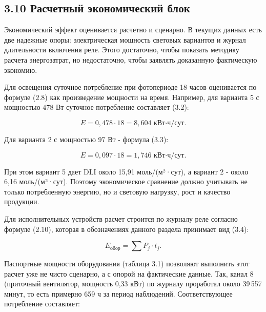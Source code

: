 \documentclass[a4paper,14pt]{extarticle}
\begin{document}
\hypertarget{ux440ux430ux441ux447ux435ux442ux43dux44bux439-ux44dux43aux43eux43dux43eux43cux438ux447ux435ux441ux43aux438ux439-ux431ux43bux43eux43a}{%
\subsection{3.10 Расчетный экономический
блок}\label{ux440ux430ux441ux447ux435ux442ux43dux44bux439-ux44dux43aux43eux43dux43eux43cux438ux447ux435ux441ux43aux438ux439-ux431ux43bux43eux43a}}

Экономический эффект оценивается расчетно и сценарно. В текущих данных
есть две надежные опоры: электрическая мощность световых вариантов и
журнал длительности включения реле. Этого достаточно, чтобы показать
методику расчета энергозатрат, но недостаточно, чтобы заявлять
доказанную фактическую экономию.

Для освещения суточное потребление при фотопериоде 18 часов оценивается
по формуле (2.8) как произведение мощности на время. Например, для
варианта 5 с мощностью 478 Вт суточное потребление составляет (3.2):

\begin{equation}
E = 0{,}478 \cdot 18 = 8{,}604 \text{ кВт·ч/сут}.
\tag{3.2}
\end{equation}

Для варианта 2 с мощностью 97 Вт - формула (3.3):

\begin{equation}
E = 0{,}097 \cdot 18 = 1{,}746 \text{ кВт·ч/сут}.
\tag{3.3}
\end{equation}

При этом вариант 5 дает DLI около 15,91 моль/(м²·сут), а вариант 2 -
около 6,16 моль/(м²·сут). Поэтому экономическое сравнение должно
учитывать не только потребленную энергию, но и световую нагрузку, рост и
качество продукции.

Для исполнительных устройств расчет строится по журналу реле согласно
формуле (2.10), которая в обозначениях данного раздела принимает вид
(3.4):

\begin{equation}
E_{\text{обор}} = \sum P_j \cdot t_j.
\tag{3.4}
\end{equation}

Паспортные мощности оборудования (таблица 3.1) позволяют выполнить этот
расчет уже не чисто сценарно, а с опорой на фактические данные. Так,
канал 8 (приточный вентилятор, мощность 0,33 кВт) по журналу проработал
около 39\,557 минут, то есть примерно 659 ч за период наблюдений.
Соответствующее потребление составляет:
\end{document}
